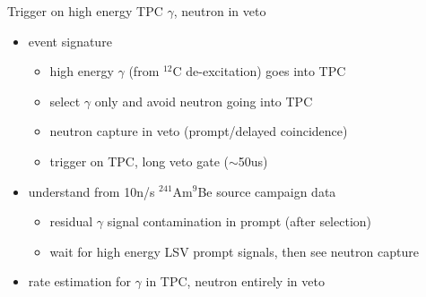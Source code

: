 \documentclass[9pt]{beamer}
\begin{document}
\begin{frame}{Trigger on high energy TPC $\gamma$, neutron in veto}
\begin{itemize}
[bullet]
\item event signature
	\begin{itemize}
	[default]
	\item high energy $\gamma$ (from $^{12}$C de-excitation) goes into TPC
	\item select $\gamma$ only and avoid neutron going into TPC
	\item neutron capture in veto (prompt/delayed coincidence) 
	\item trigger on TPC, long veto gate ($\sim$50us)
	\end{itemize}
\item understand from 10n/s $^{241}$Am$^9$Be source campaign data
	\begin{itemize}
	[default]
	\item residual $\gamma$ signal contamination in prompt (after selection)
	\item wait for high energy LSV prompt signals, then see neutron capture 
	\end{itemize}
\item rate estimation for $\gamma$ in TPC, neutron entirely in veto
\end{itemize}

\end{frame}
\end{document}
